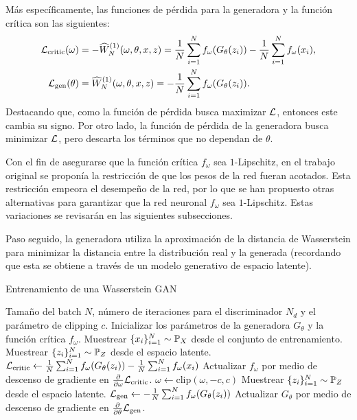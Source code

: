 Más específicamente, las funciones de pérdida para la generadora y la función crítica son las siguientes:
\begin{align}
	\mathcal{L}_{\mathrm{critic}}(\omega)
	 & = -\widehat W_N^{(1)} (
	\omega, \theta, x, z
	)
	= \frac{1}{N}\sum_{i=1}^{N} f_\omega(G_\theta(z_i)) - \frac{1}{N}\sum_{i=1}^{N} f_\omega(x_i),
	\\ \mathcal{L}_{\mathrm{gen}}(\theta)
	 & = \widehat W_N^{(1)} (
	\omega, \theta, x, z
	)
	= -\frac{1}{N}\sum_{i=1}^{N} f_\omega(G_\theta(z_i)).
\end{align}
Destacando que, como la función de pérdida busca maximizar $\mathcal{L}$, entonces este cambia su signo. Por otro lado, la función de pérdida de la generadora busca minimizar $\mathcal{L}$, pero descarta los términos que no dependan de $\theta$.

Con el fin de asegurarse que la función crítica $f_\omega$ sea $1$-Lipschitz, en el trabajo original se proponía la restricción de que los pesos de la red fueran acotados. Esta restricción empeora el desempeño de la red, por lo que se han propuesto otras alternativas para garantizar que la red neuronal $f_\omega$ sea $1$-Lipschitz. Estas variaciones se revisarán en las siguientes subsecciones.

Paso seguido, la generadora utiliza la aproximación de la distancia de Wasserstein para minimizar la distancia entre la distribución real y la generada (recordando que esta se obtiene a través de un modelo generativo de espacio latente).

\begin{algorithm}[t!]
	\caption{Entrenamiento de una Wasserstein GAN}\label{alg:WGAN}
	\begin{algorithmic}[1]
		\Require Tamaño del batch $N$, número de iteraciones para el discriminador $N_d$ y el parámetro de clipping $c$.
		\State Inicializar los parámetros de la generadora $G_\theta$ y la función crítica $f_\omega$.
		\State Muestrear $\{x_i\}_{i=1}^{N} \sim \Prob_X$ desde el conjunto de entrenamiento.
		\State Muestrear $\{z_i\}_{i=1}^{N} \sim \Prob_Z$ desde el espacio latente.
		\State $\mathcal{L}_{\mathrm{critic}} \gets
			\frac{1}{N} \sum_{i=1}^{N} f_{\omega}(G_\theta(z_i)) - \frac{1}{N} \sum_{i=1}^{N} f_{\omega}(x_i)$ 
		\State Actualizar $f_{\omega}$ por medio de descenso de gradiente en $\pdv{\omega} \mathcal{L}_{\mathrm{critic}}$.
		\State $\omega \gets \text{clip}(\omega, -c, c)$
		\EndFor
		\State Muestrear $\{z_i\}_{i=1}^{N} \sim \Prob_Z$ desde el espacio latente.
		\State $\mathcal{L}_{\mathrm{gen}} \gets - \frac{1}{N}\sum_{i=1}^{N} f_\omega(G_\theta(z_i))$ 
		\State Actualizar $G_\theta$ por medio de descenso de gradiente en $\pdv{\theta} \mathcal{L}_{\mathrm{gen}}$.
		\EndWhile
	\end{algorithmic}
\end{algorithm}


